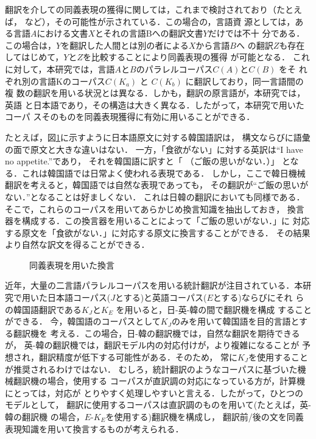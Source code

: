 翻訳を介しての同義表現の獲得に関しては，これまで検討されており（たとえば，
\cite{Barzilay2001}など），その可能性が示されている．この場合の，言語資
源としては，ある言語$A$における文書$X$とそれの言語Bへの翻訳文書$Y$だけでは不十
分である．この場合は，$Y$を翻訳した人間とは別の者による$X$から言語$B$へ
の翻訳$Z$も存在してはじめて，$Y$と$Z$を比較することにより同義表現の獲得
が可能となる．
これに対して，本研究では，言語$A$と$B$のパラレルコーパス$C(A)$と$C(B)$ をそ
れぞれ別の言語Kのコーパス$C(K_a)$ と $C(K_b)$ に翻訳しており，同一言語間の複
数の翻訳を用いる状況とは異なる．しかも，翻訳の原言語が，本研究では，英語
と日本語であり，その構造は大きく異なる．したがって，本研究で用いたコーパ
スそのものを同義表現獲得に有効に用いることができる．

たとえば，図\ref{fig_para1}に示すように日本語原文に対する韓国語訳は，
構文ならびに語彙の面で原文と大きな違いはない．
一方，「食欲がない」に対する英訳は``I have no appetite.''であり，
それを韓国語に訳すと「   
（ご飯の思いがない．）」
となる．これは韓国語では日常よく使われる表現である．
しかし，ここで韓日機械翻訳を考えると，韓国語では自然な表現であっても，
その翻訳が``ご飯の思いがない．''となることは好ましくない．
これは日韓の翻訳においても同様である．
そこで，これらのコーパスを用いてあらかじめ換言知識を抽出しておき，
換言器を構成する．この換言器を用いることによって「ご飯の思いがない．」に
対応する原文を「食欲がない．」に対応する原文に換言することができる．
その結果より自然な訳文を得ることができる．

\begin{figure}[htb]
\begin{center}
\caption{同義表現を用いた換言}
\label{fig_para1}
\end{center} 
\end{figure}

近年，大量の二言語パラレルコーパスを用いる統計翻訳が注目されている．本研
究で用いた日本語コーパス($J$とする)と英語コーパス($E$とする)ならびにそれ
らの韓国語翻訳である$K_J$と$K_E$ を用いると，日-英-韓の間で翻訳機を構成
することができる．
今，韓国語のコーパスとして$K_J$のみを用いて韓国語を目的言語とする翻訳機を
考える．この場合，日-韓の翻訳機では，自然な翻訳を期待できるが，
英-韓の翻訳機では，翻訳モデル内の対応付けが，より複雑になることが
予想され，翻訳精度が低下する可能性がある．そのため，
常に$K_J$を使用することが推奨されるわけではない．
むしろ，統計翻訳のようなコーパスに基づいた機械翻訳機の場合，使用する
コーパスが直訳調の対応になっている方が，計算機にとっては，対応が
とりやすく処理しやすいと言える．したがって，ひとつのモデルとして，
翻訳に使用するコーパスは直訳調のものを用いて(たとえば，英-韓の翻訳機
の場合，$E$-$K_E$を使用する)翻訳機を構成し，
翻訳前/後の文を同義表現知識を用いて換言するものが考えられる．




